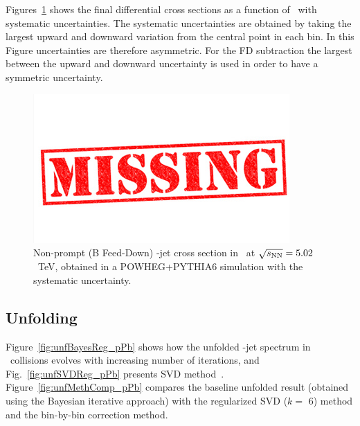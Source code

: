 Figures~\ref{fig:BFeedDown_GeneratorLevel_Spectrum_canvas} shows the final differential cross sections as a function of \ptchjet\ with systematic uncertainties. The systematic uncertainties are obtained by taking the largest upward and downward variation from the central point in each bin. In this Figure uncertainties are therefore asymmetric. For the FD subtraction the largest between the upward and downward uncertainty is used in order to have a symmetric uncertainty.

\begin{figure}[bth]
\begin{center}
\includegraphics[width=.2\textwidth]{missing}
\caption{Non-prompt (B Feed-Down) \Dstar-jet cross section in \pPb\ at $\sqrt{s_{\rm NN}}=5.02$~TeV, obtained in a POWHEG+PYTHIA6 simulation with the systematic uncertainty.} 
\label{fig:BFeedDown_GeneratorLevel_Spectrum_canvas}
\end{center}
\end{figure}


\subsection{Unfolding}
\label{sUnfoldSys}


Figure~\ref{fig:unfBayesReg_pPb} shows how the unfolded  \Dstar-jet spectrum in \pPb\ collisions evolves with increasing number of iterations, and Fig.~\ref{fig:unfSVDReg_pPb} presents SVD method~\cite{Hocker:1995}.
Figure~\ref{fig:unfMethComp_pPb} compares the baseline unfolded result (obtained using the Bayesian iterative approach) with the regularized SVD ($k=$ 6) method and the bin-by-bin correction method.


